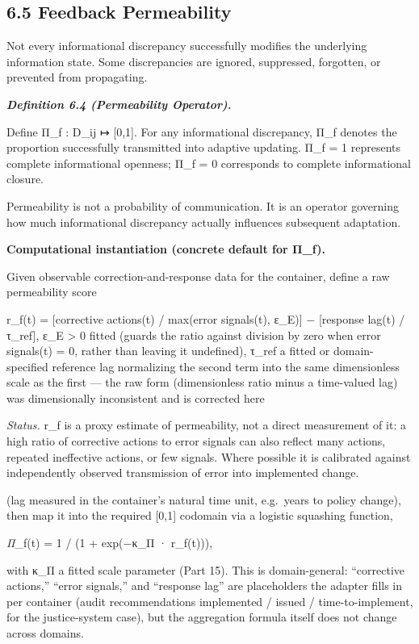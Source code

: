 \documentclass[
]{article}
\begin{document}
\hypertarget{feedback-permeability}{%
\subsection{6.5 Feedback Permeability}\label{feedback-permeability}}

Not every informational discrepancy successfully modifies the underlying
information state. Some discrepancies are ignored, suppressed,
forgotten, or prevented from propagating.

\emph{\textbf{Definition 6.4 (Permeability Operator).}}

Define Π\_f : D\_ij ↦ {[}0,1{]}. For any informational discrepancy, Π\_f
denotes the proportion successfully transmitted into adaptive updating.
Π\_f = 1 represents complete informational openness; Π\_f = 0
corresponds to complete informational closure.

Permeability is not a probability of communication. It is an operator
governing how much informational discrepancy actually influences
subsequent adaptation.

\textbf{Computational instantiation (concrete default for Π\_f).}

Given observable correction-and-response data for the container, define
a raw permeability score

r\_f(t) = {[}corrective actions(t) / max(error signals(t), ε\_E){]} −
{[}response lag(t) / τ\_ref{]}, ε\_E \textgreater{} 0 fitted (guards the
ratio against division by zero when error signals(t) = 0, rather than
leaving it undefined), τ\_ref a fitted or domain-specified reference lag
normalizing the second term into the same dimensionless scale as the
first --- the raw form (dimensionless ratio minus a time-valued lag) was
dimensionally inconsistent and is corrected here

\emph{Status.} r\_f is a proxy estimate of permeability, not a direct
measurement of it: a high ratio of corrective actions to error signals
can also reflect many actions, repeated ineffective actions, or few
signals. Where possible it is calibrated against independently observed
transmission of error into implemented change.

(lag measured in the container's natural time unit, e.g.~years to policy
change), then map it into the required {[}0,1{]} codomain via a logistic
squashing function,

\emph{Π}\_f(t) = 1 / (1 + exp(−κ\_Π · r\_f(t))),

with κ\_Π a fitted scale parameter (Part 15). This is domain-general:
``corrective actions,'' ``error signals,'' and ``response lag'' are
placeholders the adapter fills in per container (audit recommendations
implemented / issued / time-to-implement, for the justice-system case),
but the aggregation formula itself does not change across domains.
\end{document}
